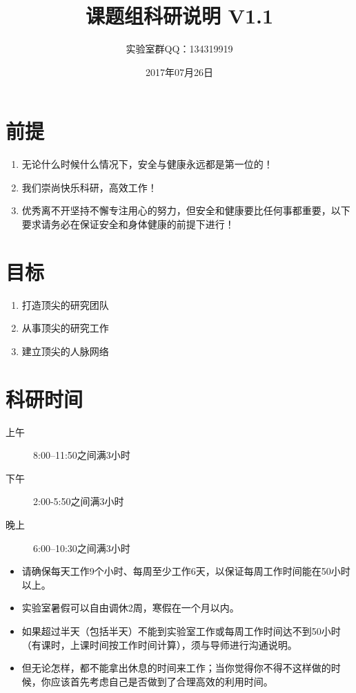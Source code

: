\documentclass[a4paper，12pt]{article}
\title{课题组科研说明 V1.1} %
\author{实验室群QQ：134319919}
\date{2017年07月26日} %
\begin{document}
\maketitle

\section{前提}

\begin{enumerate}
\item 无论什么时候什么情况下，安全与健康永远都是第一位的！
\item 我们崇尚快乐科研，高效工作！
\item 优秀离不开坚持不懈专注用心的努力，但安全和健康要比任何事都重要，以下要求请务必在保证安全和身体健康的前提下进行！
\end{enumerate}

\section{目标}

\begin{enumerate}

\item 打造顶尖的研究团队

\item 从事顶尖的研究工作

\item 建立顶尖的人脉网络

\end{enumerate}

\section{科研时间}

\begin{description}

\item[上午] 8:00--11:50之间满3小时

\item[下午] 2:00-5:50之间满3小时

\item[晚上] 6:00--10:30之间满3小时

\end{description}

\begin{itemize}

\item 请确保每天工作9个小时、每周至少工作6天，以保证每周工作时间能在50小时以上。

\item 实验室暑假可以自由调休2周，寒假在一个月以内。

\item 如果超过半天（包括半天）不能到实验室工作或每周工作时间达不到50小时（有课时，上课时间按工作时间计算），须与导师进行沟通说明。

\item 但无论怎样，都不能拿出休息的时间来工作；当你觉得你不得不这样做的时候，你应该首先考虑自己是否做到了合理高效的利用时间。

\end{itemize}
\end{document}
